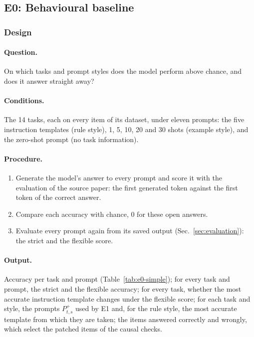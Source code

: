 \documentclass[11pt,a4paper]{article}
\begin{document}
\subsection{E0: Behavioural baseline}\label{sec:e0}
\subsubsection{Design}
\paragraph{Question.} On which tasks and prompt styles does the model perform above chance, and does it answer straight away?

\paragraph{Conditions.} The 14 tasks, each on every item of its dataset, under eleven prompts: the five instruction templates (rule style), 1, 5, 10, 20 and 30 shots (example style), and the zero-shot prompt (no task information).

\paragraph{Procedure.}
\begin{enumerate}
\item Generate the model's answer to every prompt and score it with the evaluation of the source paper: the first generated token against the first token of the correct answer.
\item Compare each accuracy with chance, 0 for these open answers.
\item Evaluate every prompt again from its saved output (Sec.~\ref{sec:evaluation}): the strict and the flexible score.
\end{enumerate}

\paragraph{Output.} Accuracy per task and prompt (Table~\ref{tab:e0-simple}); for every task and prompt, the strict and the flexible accuracy; for every task, whether the most accurate instruction template changes under the flexible score; for each task and style, the prompts $P^{+}_{t,s}$ used by E1 and, for the rule style, the most accurate template from which they are taken; the items answered correctly and wrongly, which select the patched items of the causal checks.
\end{document}
